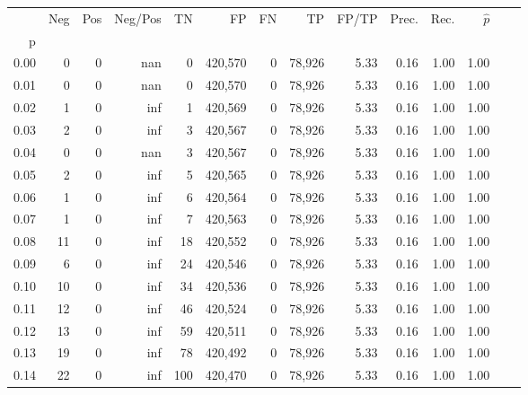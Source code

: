 \begin{tabular}{rrrrrrrrrrrrrr}
\toprule
{} &     Neg &    Pos &  Neg/Pos &       TN &       FP &      FN &      TP & FP/TP & Prec. &  Rec. & $\hat{p}$ \\
p    &         &        &          &          &          &         &         &       &       &       &           \\
\midrule
0.00 &       0 &      0 &      nan &        0 &  420,570 &       0 &  78,926 &  5.33 &  0.16 &  1.00 &      1.00 \\
0.01 &       0 &      0 &      nan &        0 &  420,570 &       0 &  78,926 &  5.33 &  0.16 &  1.00 &      1.00 \\
0.02 &       1 &      0 &      inf &        1 &  420,569 &       0 &  78,926 &  5.33 &  0.16 &  1.00 &      1.00 \\
0.03 &       2 &      0 &      inf &        3 &  420,567 &       0 &  78,926 &  5.33 &  0.16 &  1.00 &      1.00 \\
0.04 &       0 &      0 &      nan &        3 &  420,567 &       0 &  78,926 &  5.33 &  0.16 &  1.00 &      1.00 \\
0.05 &       2 &      0 &      inf &        5 &  420,565 &       0 &  78,926 &  5.33 &  0.16 &  1.00 &      1.00 \\
0.06 &       1 &      0 &      inf &        6 &  420,564 &       0 &  78,926 &  5.33 &  0.16 &  1.00 &      1.00 \\
0.07 &       1 &      0 &      inf &        7 &  420,563 &       0 &  78,926 &  5.33 &  0.16 &  1.00 &      1.00 \\
0.08 &      11 &      0 &      inf &       18 &  420,552 &       0 &  78,926 &  5.33 &  0.16 &  1.00 &      1.00 \\
0.09 &       6 &      0 &      inf &       24 &  420,546 &       0 &  78,926 &  5.33 &  0.16 &  1.00 &      1.00 \\
0.10 &      10 &      0 &      inf &       34 &  420,536 &       0 &  78,926 &  5.33 &  0.16 &  1.00 &      1.00 \\
0.11 &      12 &      0 &      inf &       46 &  420,524 &       0 &  78,926 &  5.33 &  0.16 &  1.00 &      1.00 \\
0.12 &      13 &      0 &      inf &       59 &  420,511 &       0 &  78,926 &  5.33 &  0.16 &  1.00 &      1.00 \\
0.13 &      19 &      0 &      inf &       78 &  420,492 &       0 &  78,926 &  5.33 &  0.16 &  1.00 &      1.00 \\
0.14 &      22 &      0 &      inf &      100 &  420,470 &       0 &  78,926 &  5.33 &  0.16 &  1.00 &      1.00 \\

\end{tabular}
